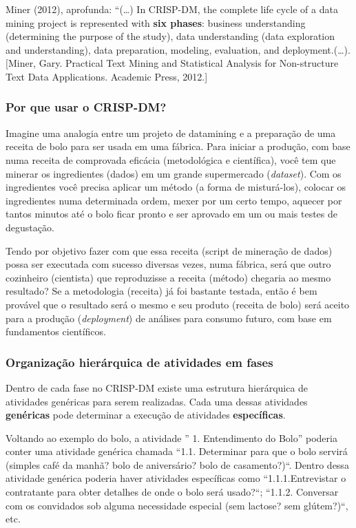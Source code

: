 \documentclass[]{article}
\begin{document}
Miner (2012), aprofunda: ``(\ldots{}) In CRISP-DM, the complete life
cycle of a data mining project is represented with \textbf{six phases}:
business understanding (determining the purpose of the study), data
understanding (data exploration and understanding), data preparation,
modeling, evaluation, and deployment.(\ldots{}). {[}Miner, Gary.
Practical Text Mining and Statistical Analysis for Non-structure Text
Data Applications. Academic Press, 2012.{]}

\subsubsection{Por que usar o CRISP-DM?}\label{por-que-usar-o-crisp-dm}

Imagine uma analogia entre um projeto de datamining e a preparação de
uma receita de bolo para ser usada em uma fábrica. Para iniciar a
produção, com base numa receita de comprovada eficácia (metodológica e
científica), você tem que minerar os ingredientes (dados) em um grande
supermercado (\emph{dataset}). Com os ingredientes você precisa aplicar
um método (a forma de misturá-los), colocar os ingredientes numa
determinada ordem, mexer por um certo tempo, aquecer por tantos minutos
até o bolo ficar pronto e ser aprovado em um ou mais testes de
degustação.

Tendo por objetivo fazer com que essa receita (script de mineração de
dados) possa ser executada com sucesso diversas vezes, numa fábrica,
será que outro cozinheiro (cientista) que reproduzisse a receita
(método) chegaria ao mesmo resultado? Se a metodologia (receita) já foi
bastante testada, então é bem provável que o resultado será o mesmo e
seu produto (receita de bolo) será aceito para a produção
(\emph{deployment}) de análises para consumo futuro, com base em
fundamentos científicos.

\subsubsection{Organização hierárquica de atividades em
fases}\label{organizacao-hierarquica-de-atividades-em-fases}

Dentro de cada fase no CRISP-DM existe uma estrutura hierárquica de
atividades genéricas para serem realizadas. Cada uma dessas atividades
\textbf{genéricas} pode determinar a execução de atividades
\textbf{específicas}.

Voltando ao exemplo do bolo, a atividade '' 1. Entendimento do Bolo''
poderia conter uma atividade genérica chamada ``1.1. Determinar para que
o bolo servirá (simples café da manhã? bolo de aniversário? bolo de
casamento?)``. Dentro dessa atividade genérica poderia haver atividades
específicas como ``1.1.1.Entrevistar o contratante para obter detalhes
de onde o bolo será usado?``; ``1.1.2. Conversar com os convidados sob
alguma necessidade especial (sem lactose? sem glútem?)``, etc.
\end{document}
